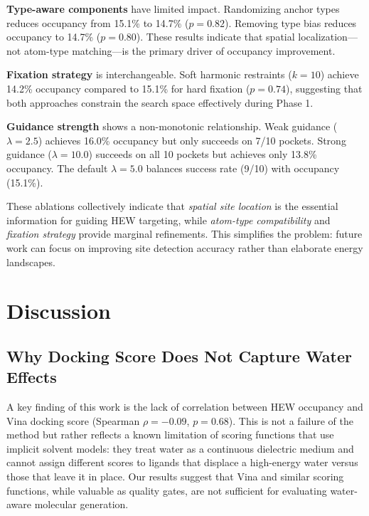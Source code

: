 \documentclass[journal=jcisd,manuscript=article]{achemso}
\begin{document}
\textbf{Type-aware components} have limited impact. Randomizing anchor
types reduces occupancy from 15.1\% to 14.7\% ($p = 0.82$). Removing
type bias reduces occupancy to 14.7\% ($p = 0.80$). These results indicate
that spatial localization---not atom-type matching---is the primary driver
of occupancy improvement.

\textbf{Fixation strategy} is interchangeable. Soft harmonic restraints
($k = 10$) achieve 14.2\% occupancy compared to 15.1\% for hard fixation
($p = 0.74$), suggesting that both approaches constrain the search space
effectively during Phase 1.

\textbf{Guidance strength} shows a non-monotonic relationship. Weak
guidance ($\lambda = 2.5$) achieves 16.0\% occupancy but only succeeds
on 7/10 pockets. Strong guidance ($\lambda = 10.0$) succeeds on all 10
pockets but achieves only 13.8\% occupancy. The default $\lambda = 5.0$
balances success rate (9/10) with occupancy (15.1\%).

These ablations collectively indicate that \emph{spatial site location}
is the essential information for guiding HEW targeting, while
\emph{atom-type compatibility} and \emph{fixation strategy} provide
marginal refinements. This simplifies the problem: future work can focus
on improving site detection accuracy rather than elaborate energy landscapes.

\section{Discussion}

\subsection{Why Docking Score Does Not Capture Water Effects}

A key finding of this work is the lack of correlation between HEW occupancy
and Vina docking score (Spearman $\rho = -0.09$, $p = 0.68$). This
is not a failure of the method but rather reflects a known limitation of
scoring functions that use implicit solvent models: they treat water as a
continuous dielectric medium and cannot assign different scores to ligands
that displace a high-energy water versus those that leave it in place.
Our results suggest that Vina and similar scoring functions, while valuable
as quality gates, are not sufficient for evaluating water-aware molecular
generation.
\end{document}
